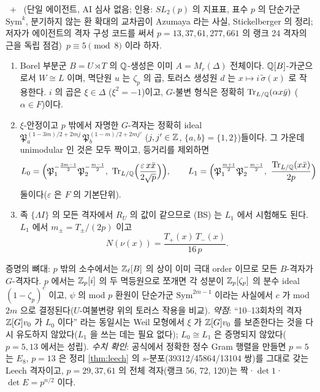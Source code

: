 \begin{theorem}\label{thm:ideal}\tagPL\ + \tagN\ (단일 에이전트, AI 심사 없음; 인용: $SL_2(p)$ 의 지표표, 표수 $p$ 의 단순가군 $\mathrm{Sym}^k$, 분기하지 않는 환 확대의 교차곱이 Azumaya 라는 사실, Stickelberger 의 정리; 저자가 에이전트의 격자 구성 코드를 써서 $p=13,37,61,277,661$ 의 랭크 24 격자의 근을 독립 점검)\
$p\equiv5\pmod8$ 이라 하자.
\begin{enumerate}
\item Borel 부분군 $B=U\rtimes T$ 의 $\mathbb{Q}$-생성은 이미 $A=M_r(\Delta)$ 전체이다. $\mathbb{Q}[B]$-가군으로서 $W\cong L$ 이며, 멱단원 $u$ 는 $\zeta_p$ 의 곱, 토러스 생성원 $d$ 는 $x\mapsto i\,\tilde\sigma(x)$ 로 작용한다. $i$ 의 곱은 $\xi\in\Delta$ ($\xi^2=-1$)이고, $G$-불변 형식은 정확히 $\mathrm{Tr}_{L/\mathbb{Q}}(\alpha x\bar y)$ ($\alpha\in F$)이다.
\item $\xi$-안정이고 $p$ 밖에서 자명한 $G$-격자는 정확히 ideal $\mathfrak P_a^{(1-3m)/2+2mj}\,\mathfrak P_b^{(1-m)/2+2mj'}$ ($j,j'\in\mathbb{Z}$, $\{a,b\}=\{1,2\}$)들이다. 그 가운데 unimodular 인 것은 모두 짝이고, 등거리를 제외하면
\[
L_0=\Big(\mathfrak P_1^{-\frac{3m-1}2}\mathfrak P_2^{-\frac{m-1}2},\ \Tr_{L/\Q}\Big(\frac{\varepsilon\,x\bar x}{2\sqrt p}\Big)\Big),\qquad
L_1=\Big(\mathfrak P_1^{\frac{m+1}2}\mathfrak P_2^{-\frac{m-1}2},\ \frac{\Tr_{L/\Q}(x\bar x)}{2p}\Big)
\]
둘이다($\varepsilon$ 은 $F$ 의 기본단위).
\item 족 $\{\Lambda I\}$ 의 모든 격자에서 $R_U$ 의 값이 같으므로 (BS) 는 $L_1$ 에서 시험해도 된다. $L_1$ 에서 $m_\pm=T_\pm/(2p)$ 이고
\[
N(\nu(x))=\frac{T_+(x)\,T_-(x)}{16\,p}.
\]
\end{enumerate}
\end{theorem}
\noindent 증명의 뼈대: $p$ 밖의 소수에서는 $\mathbb{Z}_\ell[B]$ 의 상이 이미 극대 order 이므로 모든 $B$-격자가 $G$-격자다. $p$ 에서는 $\mathbb{Z}_p[i]$ 의 두 멱등원으로 쪼개면 각 성분이 $\mathbb{Z}_p[\zeta_p]$ 의 분수 ideal $(1-\zeta_p)^c$ 이고, $\psi$ 의 mod $p$ 환원이 단순가군 $\mathrm{Sym}^{2m-1}$ 이라는 사실에서 $c$ 가 mod $2m$ 으로 결정된다($U$-여불변량 위의 토러스 작용을 비교). \emph{약점}: ``10--13회차의 격자 $\mathbb{Z}[G]v_0$ 가 $L_0$ 이다'' 라는 동일시는 Weil 모형에서 $\xi$ 가 $\mathbb{Z}[G]v_0$ 를 보존한다는 것을 다시 유도하지 않았다($L_1$ 을 쓰는 데는 필요 없다); $L_0\cong L_1$ 은 증명되지 않았다($p=5,13$ 에서는 성립). \emph{수치 확인}: 공식에서 정확한 정수 Gram 행렬을 만들면 $p=5$ 는 $E_8$, $p=13$ 은 정리 \ref{thm:leech} 의 $s$-분포(39312/45864/13104 쌍)를 그대로 갖는 Leech 격자이고, $p=29,37,61$ 의 전체 격자(랭크 56, 72, 120)는 짝·$\det1$·$\det E=p^{n/2}$ 이다.


